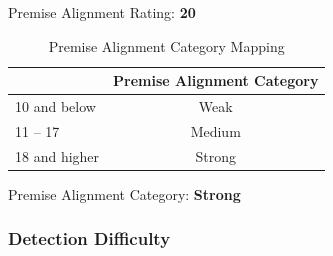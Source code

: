 \begin{fullwidth}
Premise Alignment Rating: \textbf{20}

\begin{table}[H]
\centering
\begin{tabular}{|l|c|}
\hline
\rowcolor[HTML]{96BEE6} 
\multicolumn{1}{|c|}{\cellcolor[HTML]{96BEE6}\textbf{Premise Alignment Rating}} & \textbf{Premise Alignment Category} \\ \hline
10 and below                                                                    & Weak                                \\ \hline
11 – 17                                                                         & Medium                              \\ \hline
18 and higher                                                                   & Strong                              \\ \hline
\end{tabular}
\captionsetup{justification=centering}
\caption{Premise Alignment Category Mapping}
\end{table}

Premise Alignment Category: \textbf{Strong}

\subsubsection{Detection Difficulty} %


\end{fullwidth}
